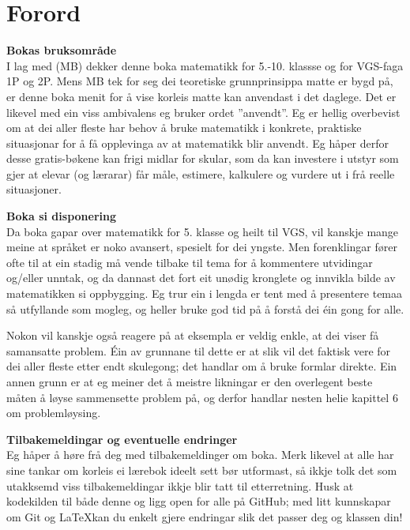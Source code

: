 


\newpage
\section*{Forord}
\textbf{Bokas bruksområde}\\
I lag med  (MB) dekker denne boka matematikk for 5.-10. klassse og for VGS-faga 1P og 2P. Mens MB tek for seg dei teoretiske grunnprinsippa matte er bygd på, er denne boka menit for å vise korleis matte kan anvendast i det daglege. Det er likevel med ein viss ambivalens eg bruker ordet ''anvendt''. Eg er hellig overbevist om at dei aller fleste har behov å bruke matematikk i konkrete, praktiske situasjonar for å få opplevinga av at matematikk blir anvendt. Eg håper derfor desse gratis-bøkene kan frigi midlar for skular, som da kan investere i utstyr som gjer at elevar (og lærarar) får måle, estimere, kalkulere og vurdere ut i frå reelle situasjoner.\vsk

\textbf{Boka si disponering} \\
Da boka gapar over matematikk for 5. klasse og heilt til VGS, vil kanskje mange meine at språket er noko avansert, spesielt for dei yngste. Men forenklingar fører ofte til at ein stadig må vende tilbake til tema for å kommentere utvidingar og/eller unntak, og da dannast det fort eit unødig kronglete og innvikla bilde av matematikken si oppbygging. Eg trur ein i lengda er tent med å presentere temaa så utfyllande som mogleg, og heller bruke god tid på å forstå dei éin gong for alle.\vsk

Nokon vil kanskje også reagere på at eksempla er veldig enkle, at dei viser få samansatte problem. Éin av grunnane til dette er at slik vil det faktisk vere for dei aller fleste etter endt skulegong; det handlar om å bruke formlar direkte. Ein annen grunn er at eg meiner det å meistre likningar er den overlegent beste måten å løyse sammensette problem på, og derfor handlar nesten helie kapittel 6 om problemløysing.\vsk


\textbf{Tilbakemeldingar og eventuelle endringer} \\
Eg håper å høre frå deg med tilbakemeldinger om boka. Merk likevel at alle har sine tankar om korleis ei lærebok ideelt sett bør utformast, så ikkje tolk det som utakksemd viss tilbakemeldingar ikkje blir tatt til etterretning. Husk at kodekilden til både denne  og \mb\;ligg open for alle på GitHub; med litt kunnskapar om Git og \LaTeX\;kan du enkelt gjere endringar slik det passer deg og klassen din!



